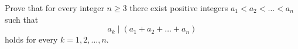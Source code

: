 Prove that for every integer $n\geq 3$ there exist positive integers $a_1<a_2<\ldots<a_n$ such that
$$a_k \mid (a_1+a_2+\ldots+a_n)$$
holds for every $k=1,2,\ldots,n$.
